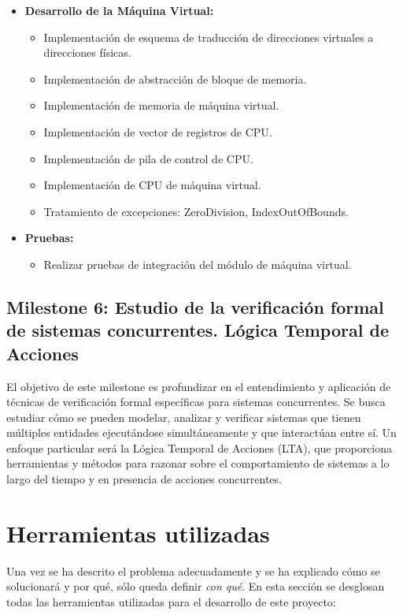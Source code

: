 \begin{itemize}
    \item \textbf{Desarrollo de la Máquina Virtual:}
    \begin{itemize}
        \item Implementación de esquema de traducción de direcciones virtuales a direcciones físicas.
        \item Implementación de abstracción de bloque de memoria.
        \item Implementación de memoria de máquina virtual.
        \item Implementación de vector de registros de CPU.
        \item Implementación de pila de control de CPU.
        \item Implementación de CPU de máquina virtual.
        \item Tratamiento de excepciones: ZeroDivision, IndexOutOfBounds.
    \end{itemize}
    \item \textbf{Pruebas:}
    \begin{itemize}
        \item Realizar pruebas de integración del módulo de máquina virtual.
    \end{itemize}
\end{itemize}

\subsection{Milestone 6: Estudio de la verificación formal de sistemas concurrentes. Lógica Temporal de Acciones}
El objetivo de este milestone es profundizar en el entendimiento y aplicación de técnicas de verificación formal específicas para sistemas concurrentes. Se busca estudiar cómo se pueden modelar, analizar y verificar sistemas que tienen múltiples entidades ejecutándose simultáneamente y que interactúan entre sí. Un enfoque particular será la Lógica Temporal de Acciones (LTA), que proporciona herramientas y métodos para razonar sobre el comportamiento de sistemas a lo largo del tiempo y en presencia de acciones concurrentes.

\section{Herramientas utilizadas}
Una vez se ha descrito el problema adecuadamente y se ha explicado cómo se solucionará y por qué, sólo queda definir \textit{con qué}. En esta sección se desglosan todas las herramientas utilizadas para el desarrollo de este proyecto:

